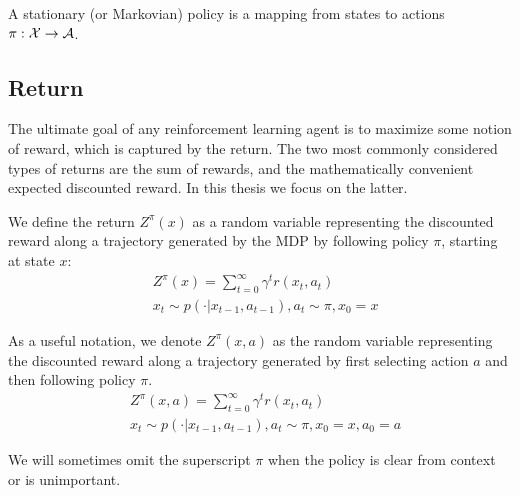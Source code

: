 \begin{definition}
A stationary (or Markovian) policy is a mapping from states to actions $\pi:\mathcal{X} \to \mathcal{A}$.
\end{definition}


\subsection{Return}

The ultimate goal of any reinforcement learning agent is to maximize some notion of reward, which is captured by the return. The two most commonly considered types of returns are the sum of rewards, and the mathematically convenient expected discounted reward. In this thesis we focus on the latter.


We define the return $Z^\pi(x)$ as a random variable representing the discounted reward along a trajectory generated by the MDP by following policy $\pi$, starting at state $x$:
\begin{equation}\label{eqn:return}
\begin{split}
&Z^\pi(x)=\sum_{t=0}^\infty \gamma^tr(x_t,a_t)\\
&x_t \sim p(\cdot|x_{t-1}, a_{t-1}), a_t \sim \pi, x_0 = x
\end{split}
\end{equation}

As a useful notation, we denote $Z^\pi(x, a)$ as the random variable representing the discounted reward along a trajectory generated by first selecting action $a$ and then following policy $\pi$.
\begin{equation}
\begin{split}
&Z^\pi(x, a)=\sum_{t=0}^\infty \gamma^tr(x_t,a_t)\\
&x_t \sim p(\cdot|x_{t-1}, a_{t-1}), a_t \sim \pi, x_0 = x, a_0 = a
\end{split}
\end{equation}

We will sometimes omit the superscript $\pi$ when the policy is clear from context or is unimportant.

